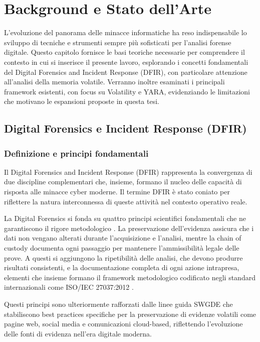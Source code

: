\chapter{Background e Stato dell'Arte}

L'evoluzione del panorama delle minacce informatiche ha reso indispensabile lo sviluppo di tecniche e strumenti sempre più sofisticati per l'analisi forense digitale. Questo capitolo fornisce le basi teoriche necessarie per comprendere il contesto in cui si inserisce il presente lavoro, esplorando i concetti fondamentali del Digital Forensics and Incident Response (DFIR), con particolare attenzione all'analisi della memoria volatile. Verranno inoltre esaminati i principali framework esistenti, con focus su Volatility e YARA, evidenziando le limitazioni che motivano le espansioni proposte in questa tesi.

\section{Digital Forensics e Incident Response (DFIR)}

\subsection{Definizione e principi fondamentali}

Il Digital Forensics and Incident Response (DFIR) rappresenta la convergenza di due discipline complementari che, insieme, formano il nucleo delle capacità di risposta alle minacce cyber moderne. Il termine DFIR è stato coniato per riflettere la natura interconnessa di queste attività nel contesto operativo reale.

La Digital Forensics si fonda su quattro principi scientifici fondamentali che ne garantiscono il rigore metodologico \cite{kent2006}. La preservazione dell'evidenza assicura che i dati non vengano alterati durante l'acquisizione e l'analisi, mentre la chain of custody documenta ogni passaggio per mantenere l'ammissibilità legale delle prove. A questi si aggiungono la ripetibilità delle analisi, che devono produrre risultati consistenti, e la documentazione completa di ogni azione intrapresa, elementi che insieme formano il framework metodologico codificato negli standard internazionali come ISO/IEC 27037:2012 \cite{iso27037}.

Questi principi sono ulteriormente rafforzati dalle linee guida SWGDE \cite{swgde2022} che stabiliscono best practices specifiche per la preservazione di evidenze volatili come pagine web, social media e comunicazioni cloud-based, riflettendo l'evoluzione delle fonti di evidenza nell'era digitale moderna.


